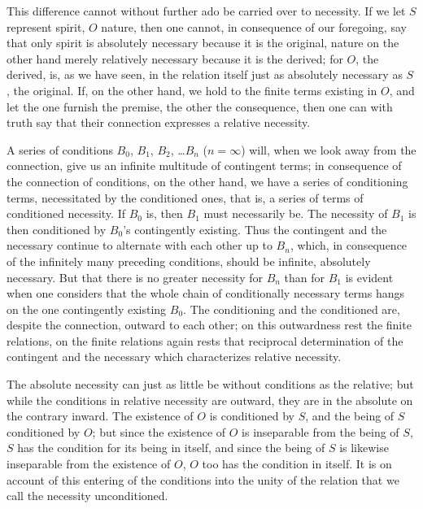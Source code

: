 \documentclass[12pt]{book}
\begin{document}
This difference cannot without further ado be carried over to necessity. If we let $S$ represent
spirit, $O$ nature, then one cannot, in consequence of our foregoing, say that only spirit is
absolutely necessary because it is the original, nature on the other hand merely relatively
necessary because it is the derived; for $O$, the derived, is, as we have seen, in the relation
itself just as absolutely necessary as $S$, the original. If, on the other hand, we hold to the
finite terms existing in $O$, and let the one furnish the premise, the other the consequence,
then one can with truth say that their connection expresses a relative necessity.

A series of conditions $B_0$, $B_1$, $B_2$, \ldots $B_n$ ($n = \infty$) will, when we look away
from the connection, give us an infinite multitude of contingent terms; in consequence of the
connection of conditions, on the other hand, we have a series of conditioning terms, necessitated
by the conditioned ones, that is, a series of terms of conditioned necessity. If $B_0$ is, then
$B_1$ must necessarily be. The necessity of $B_1$ is then conditioned by $B_0$'s contingently
existing. Thus the contingent and the necessary continue to alternate with each other up to
$B_n$, which, in consequence of the infinitely many preceding conditions, should be infinite,
absolutely necessary. But that there is no greater necessity for $B_n$ than for $B_1$ is evident
when one considers that the whole chain of conditionally necessary terms hangs on the one
contingently existing $B_0$. The conditioning and the conditioned are, despite the connection,
outward to each other; on this outwardness rest the finite relations, on the finite relations
again rests that reciprocal determination of the contingent and the necessary which characterizes
relative necessity.

The absolute necessity can just as little be without conditions as the relative; but while the
conditions in relative necessity are outward, they are in the absolute on the contrary inward.
The existence of $O$ is conditioned by $S$, and the being of $S$ conditioned by $O$; but since the
existence of $O$ is inseparable from the being of $S$, $S$ has the condition for its being in
itself, and since the being of $S$ is likewise inseparable from the existence of $O$, $O$ too has
the condition in itself. It is on account of this entering of the conditions into the unity of the
relation that we call the necessity unconditioned.
\end{document}
